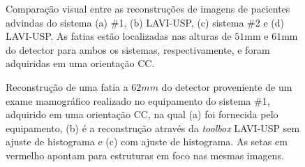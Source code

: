 \begin{figure}[!ht]
	\centering	
	\caption{Comparação visual entre as reconstruções de imagens de pacientes advindas do sistema (a) \#1, (b) LAVI-USP, (c) sistema \#2 e (d) LAVI-USP. As fatias estão localizadas nas alturas de $51$mm e $61$mm do detector para ambos os sistemas, respectivamente, e foram adquiridas em uma orientação \acs{CC}.}
	
	\hfill
	\hfill
	\hfill
	\label{fig:imgCap6ClinicalRecon}
\end{figure}


\begin{figure}[!ht]
	\centering	
	\caption{Reconstrução de uma fatia a $62mm$ do detector proveniente de um exame mamográfico realizado no equipamento do sistema \#1, adquirido em uma orientação \acs{CC}, na qual (a) foi fornecida pelo equipamento, (b) é a reconstrução através da \textit{toolbox} LAVI-USP sem ajuste de histograma e (c) com ajuste de histograma. As setas em vermelho apontam para estruturas em foco nas mesmas imagens. }
	
	
	
	\hfil
	\label{fig:imgCap6ClinicalGECC}
\end{figure}

